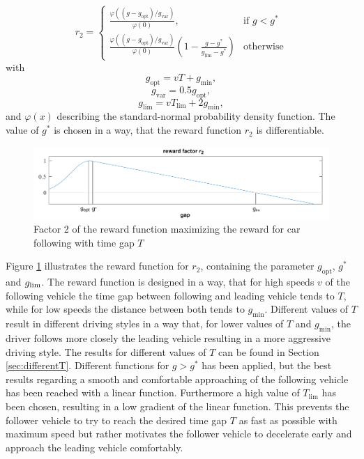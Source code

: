 \documentclass[review]{elsarticle}
\providecommand{\martin}[1]{#1}                  %
\providecommand{\martinc}[1]{}                  %
\providecommand{\sub}[1]{_{\mathrm{#1}}}  %
\providecommand{\3}{{\ss}}
\begin{document}
\begin{equation}
\label{eq:r2_CFP}
r_2  = 
\begin{cases}
\frac{\varphi((g-g\sub{opt})/g\sub{var})}{\varphi(0)},
& \text{if } g < g^*\\
\frac{\varphi((g-g\sub{opt})/g\sub{var})}{\varphi(0)}
\left(1-\frac{g-g^*}{g\sub{lim} - g^*}\right)  & \text{otherwise}
\end{cases}
\end{equation}
with 
\begin{equation}
\label{eq:r21}
g\sub{opt} = vT + g\sub{min},
\end{equation}
\begin{equation}
\label{eq:r22}
g\sub{var} = 0.5g\sub{opt},
\end{equation}
\begin{equation}
\label{eq:r23}
g\sub{lim} = vT\sub{lim} + 2g\sub{min},
\end{equation}
%
and $\varphi(x)$ describing the standard-normal probability density
function. The value of $g^*$ is chosen in a way, that the reward function $r_2$ is differentiable.
%
\begin{figure}
	\centering
	\includegraphics[width=12cm]{images/RewardFunc1}
	\caption{Factor 2 of the reward function maximizing the reward
		for car following with time gap $T$} 
	\label{fig:RewardFunc1}
\end{figure}
%
Figure \ref{fig:RewardFunc1} illustrates the reward function for
$r_2$, containing the parameter $g\sub{opt}$, $g^*$ and $g_{\rm
	lim}$. The reward function is designed in a way, that for high speeds $v$
of the following vehicle the time gap between following and leading
vehicle tends to $T$, while for low speeds the distance
between both tends to $g\sub{min}$. Different values of $T$
result in different driving styles in a way that, for lower values of
$T$ and $g\sub{min}$, the driver follows
more closely the leading vehicle resulting in a more aggressive
driving style. The results for different values of $T$ can
be found in Section \ref{sec:differentT}. Different functions for $g
> g^*$ has been applied, but the best results regarding a smooth and
comfortable approaching of the following vehicle has been reached with
a linear function. Furthermore a high value of $T\sub{lim}$ has been
chosen, resulting in a low gradient of the linear function. This
prevents the follower vehicle to try to reach the desired time gap $T$
as fast as possible with \martin{maximum} speed \martinc{maximal
  speed: sehr hohe Geschwindigkeit; maximum speed: maximale
  Geschwindigkeit, also $v\sub{des}$. Ich glaube, Letzteres ist hier gemeint.}but rather motivates the follower vehicle to decelerate early and approach the leading vehicle comfortably.
\end{document}

